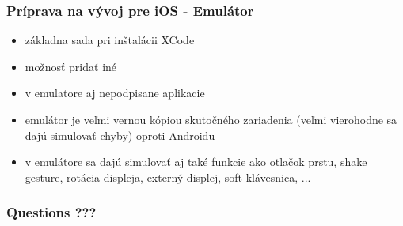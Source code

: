 \documentclass[serif,mathserif]{beamer}
\begin{document}
\begin{frame}
  \frametitle{Príprava na vývoj pre iOS - Emulátor}
  \begin{itemize}
	\item základna sada pri inštalácii XCode \pause
	\item možnosť pridať iné\pause
	\item v emulatore aj nepodpisane aplikacie\pause
	\item emulátor je veľmi vernou kópiou skutočného zariadenia (veľmi vierohodne sa dajú simulovať chyby) oproti Androidu \pause
	\item v emulátore sa dajú simulovať aj také funkcie ako otlačok prstu, shake gesture, rotácia displeja, externý displej, soft klávesnica, ...
	\end{itemize}
\end{frame}

\begin{frame}
  \frametitle{Questions ???}
\end{frame}
\end{document}
